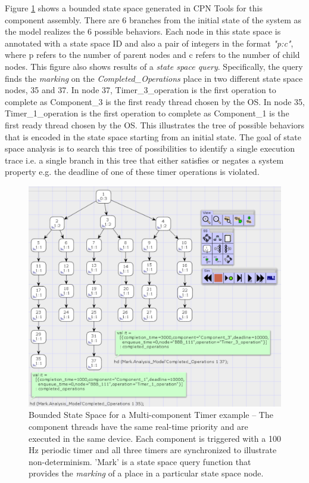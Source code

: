 Figure \ref{fig:SSScreenshot} shows a bounded state space generated in CPN Tools for this component assembly. There are 6 branches from the initial state of the system as the model realizes the 6 possible behaviors. Each node in this state space is annotated with a state space ID and also a pair of integers in the format \emph{"p:c"}, where p refers to the number of parent nodes and c refers to the number of child nodes. This figure also shows results of a \emph{state space query}. Specifically, the query finds the \emph{marking} on the \emph{Completed\_Operations} place in two different state space nodes, 35 and 37. In node 37, Timer\_3\_operation is the first operation to complete as Component\_3 is the first ready thread chosen by the OS. In node 35, Timer\_1\_operation is the first operation to complete as Component\_1 is the first ready thread chosen by the OS. This illustrates the tree of possible behaviors that is encoded in the state space starting from an initial state. The goal of state space analysis is to search this tree of possibilities to identify a single execution trace i.e. a single branch in this tree that either satisfies or negates a system property e.g. the deadline of one of these timer operations is violated. 


\begin{figure}[htb]
	\centering
	\includegraphics[width=\textwidth]{./img/state-space-analysis.png}
	\caption{Bounded State Space for a Multi-component Timer example -- The component threads have the same real-time priority and are executed in the same device. Each component is triggered with a 100 Hz periodic timer and all three timers are synchronized to illustrate non-determinism. 'Mark' is a state space query function that provides the \emph{marking} of a place in a particular state space node.}
	\label{fig:SSScreenshot}
\end{figure}
\FloatBarrier

